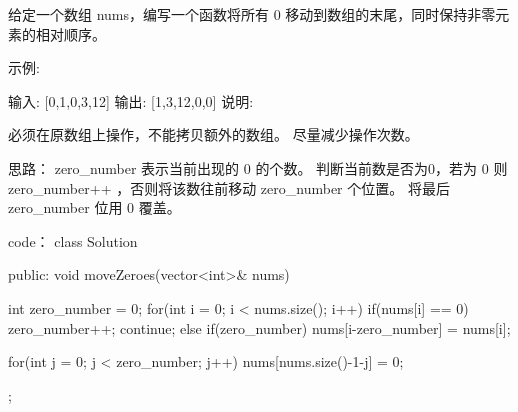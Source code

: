 给定一个数组 nums，编写一个函数将所有 0 移动到数组的末尾，同时保持非零元素的相对顺序。

示例:

输入: [0,1,0,3,12]
输出: [1,3,12,0,0]
说明:

必须在原数组上操作，不能拷贝额外的数组。
尽量减少操作次数。




















思路：
zero_number 表示当前出现的 0 的个数。
判断当前数是否为0，若为 0 则 zero_number++ ，否则将该数往前移动 zero_number 个位置。
将最后 zero_number 位用 0 覆盖。
























code：
class Solution {
public:
    void moveZeroes(vector<int>& nums) {
        int zero_number = 0;
        for(int i = 0; i < nums.size(); i++)
        {
            if(nums[i] == 0)
            {
                zero_number++; 
                continue;
            }
            else
            {
                if(zero_number) nums[i-zero_number] = nums[i];
            }
        }
        
        for(int j = 0; j < zero_number; j++)
        {
            nums[nums.size()-1-j] = 0;
        }
    }
};